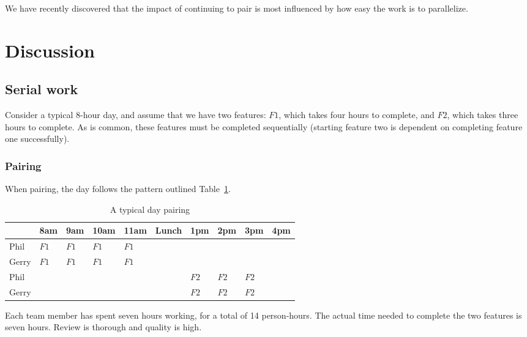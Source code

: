 \documentclass[letterpaper]{article}
\theoremstyle{definition}
\begin{document}
    We have recently discovered that the impact of continuing to pair is most influenced by how easy the work is to
    parallelize.


    \section{Discussion}\label{sec:discussion}

    \subsection{Serial work}\label{subsec:serial-work}

    Consider a typical 8-hour day, and assume that we have two features: $F1$, which takes four hours to complete, and
    $F2$, which takes three hours to complete.
    As is common, these features must be completed sequentially (starting feature two is dependent on completing feature
    one successfully).

    \subsubsection{Pairing}\label{subsubsec:serial-pairing}

    When pairing, the day follows the pattern outlined Table~\ref{tab:serial-pair}.

    \begin{table}[h]
        \centering
        \tiny
        \begin{tabular}{ |l|l|l|l|l|l|l|l|l|l| }
            \hline
            & 8am  & 9am  & 10am & 11am & Lunch & 1pm  & 2pm  & 3pm  & 4pm \\
            \hline
            Phil  & $F1$ & $F1$ & $F1$ & $F1$ &       &      &      &      &     \\
            \hline
            Gerry & $F1$ & $F1$ & $F1$ & $F1$ &       &      &      &      &     \\
            \hline
            Phil  &      &      &      &      &       & $F2$ & $F2$ & $F2$ &     \\
            \hline
            Gerry &      &      &      &      &       & $F2$ & $F2$ & $F2$ &     \\
            \hline
        \end{tabular}
        \caption{A typical day pairing}
        \label{tab:serial-pair}
    \end{table}

    Each team member has spent seven hours working, for a total of 14 person-hours.
    The actual time needed to complete the two features is seven hours.
    Review is thorough and quality is high.
\end{document}

